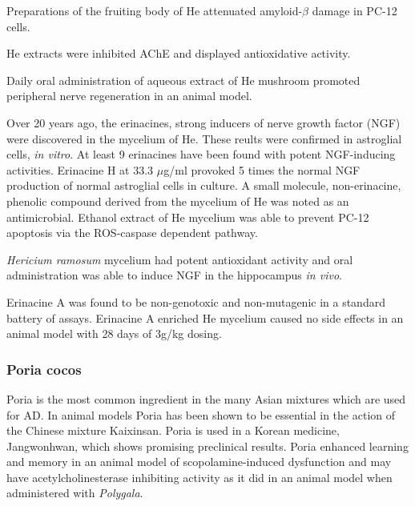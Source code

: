 \documentclass[twocolumn]{article}
\begin{document}
Preparations of the fruiting body of He
attenuated amyloid-$\beta$ damage in PC-12 cells.
\cite{liu2015systemic}


He extracts were inhibited AChE and displayed antioxidative activity.
\cite{jung2007ache}



Daily oral administration of
aqueous extract of He mushroom
promoted peripheral nerve regeneration
in an animal model.
\cite{wong2011peripheral,
wong2014hericium}


Over 20 years ago, the erinacines,
strong inducers of nerve growth factor (NGF) were discovered
in the mycelium of He.
\cite{kawagishi1994erinacines}
These reults were confirmed in astroglial cells, \textit{in vitro}.
\cite{
kawagishi1996erinacines,
kawagishi1996erinacine}
At least 9 erinacines have been found with potent NGF-inducing
activities. Erinacine H at 33.3 $\mu$g/ml provoked 5 times
the normal NGF production of normal astroglial cells in culture.
\cite{
lee2000two,
kawagishi2006erinacines}
A small molecule, non-erinacine, phenolic compound derived from
the mycelium of He was noted as an antimicrobial.
\cite{okamoto1993antimicrobial}
Ethanol extract of He mycelium was able to
prevent PC-12 apoptosis via the ROS-caspase dependent pathway.
\cite{chang2016improvement}

\textit{Hericium ramosum} mycelium had potent antioxidant activity
and oral administration was able to
induce NGF in the hippocampus \textit{in vivo}.
\cite{suruga2015effects}

Erinacine A was found to be non-genotoxic and
non-mutagenic in a standard battery of assays.
\cite{li2014genotoxicity}
Erinacine A enriched He mycelium caused no side effects
in an animal model with 28 days of 3g/kg dosing.
\cite{li2014evaluation}









\subsubsection{Poria cocos}

Poria is the most common ingredient in the
many Asian mixtures which are used for AD.
In animal models Poria has been shown to be essential
in the action of the Chinese mixture Kaixinsan.
\cite{gao2010comparision}
Poria is used in a Korean medicine, Jangwonhwan,
which shows promising preclinical results.
\cite{seo2010modified}
Poria enhanced learning and memory in an animal
model of scopolamine-induced dysfunction
\cite{zhang2012effects}
and may have acetylcholinesterase inhibiting activity
as it did in an animal model when administered with
\textit{Polygala}.
\cite{li2011experimental}
\end{document}
